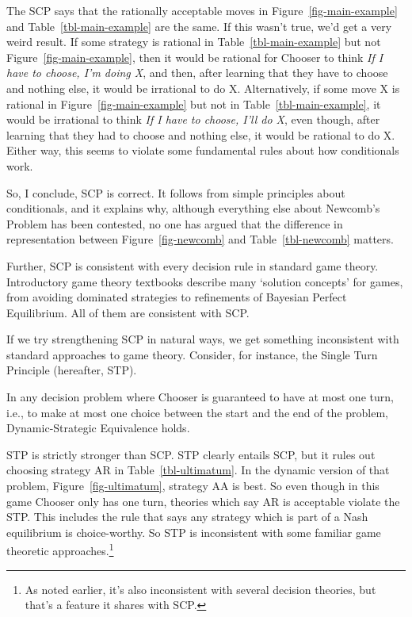 \documentclass[
  10pt,
  letterpaper,
  DIV=11,
  numbers=noendperiod,
  twoside]{scrartcl}
\providecommand{\tightlist}{%
  \setlength{\itemsep}{0pt}\setlength{\parskip}{0pt}}\usepackage{longtable,booktabs,array}
\begin{document}
The SCP says that the rationally acceptable moves in
Figure~\ref{fig-main-example} and Table~\ref{tbl-main-example} are the
same. If this wasn't true, we'd get a very weird result. If some
strategy is rational in Table~\ref{tbl-main-example} but not
Figure~\ref{fig-main-example}, then it would be rational for Chooser to
think \emph{If I have to choose, I'm doing X}, and then, after learning
that they have to choose and nothing else, it would be irrational to do
X. Alternatively, if some move X is rational in
Figure~\ref{fig-main-example} but not in Table~\ref{tbl-main-example},
it would be irrational to think \emph{If I have to choose, I'll do X},
even though, after learning that they had to choose and nothing else, it
would be rational to do X. Either way, this seems to violate some
fundamental rules about how conditionals work.

So, I conclude, SCP is correct. It follows from simple principles about
conditionals, and it explains why, although everything else about
Newcomb's Problem has been contested, no one has argued that the
difference in representation between Figure~\ref{fig-newcomb} and
Table~\ref{tbl-newcomb} matters.

Further, SCP is consistent with every decision rule in standard game
theory. Introductory game theory textbooks describe many `solution
concepts' for games, from avoiding dominated strategies to refinements
of Bayesian Perfect Equilibrium. All of them are consistent with SCP.

If we try strengthening SCP in natural ways, we get something
inconsistent with standard approaches to game theory. Consider, for
instance, the Single Turn Principle (hereafter, STP).

\begin{description}
\tightlist
\item[Single Turn Principle]
In any decision problem where Chooser is guaranteed to have at most one
turn, i.e., to make at most one choice between the start and the end of
the problem, Dynamic-Strategic Equivalence holds.
\end{description}

STP is strictly stronger than SCP. STP clearly entails SCP, but it rules
out choosing strategy AR in Table~\ref{tbl-ultimatum}. In the dynamic
version of that problem, Figure~\ref{fig-ultimatum}, strategy AA is
best. So even though in this game Chooser only has one turn, theories
which say AR is acceptable violate the STP. This includes the rule that
says any strategy which is part of a Nash equilibrium is choice-worthy.
So STP is inconsistent with some familiar game theoretic
approaches.\footnote{As noted earlier, it's also inconsistent with
  several decision theories, but that's a feature it shares with SCP.}
\end{document}
